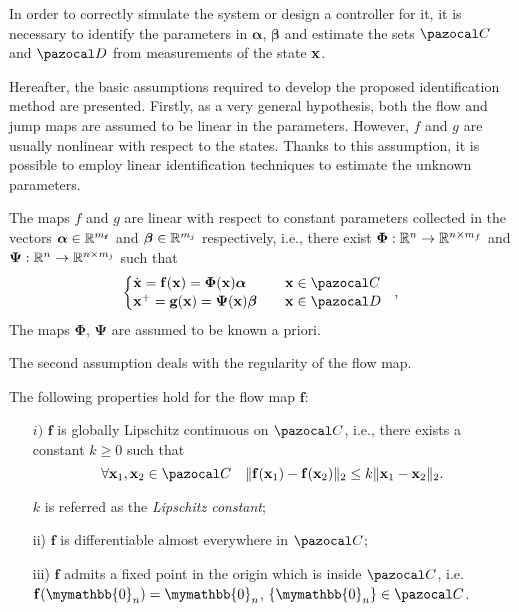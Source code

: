 In order to correctly simulate the system or design a controller for it, it is necessary to identify the parameters in $\bm{\alpha}$, $\bm{\beta}$ and estimate the sets $\C$ and $\D$ from measurements of the state $\mathbf{x}$.

Hereafter, the basic assumptions required to develop the proposed identification method are presented.
Firstly, as a very general hypothesis, both the flow and jump maps are assumed to be linear in the parameters. However, $f$ and $g$ are usually nonlinear with respect to the states.
Thanks to this assumption, it is possible to employ linear identification techniques to estimate the unknown parameters. 
\begin{assum}\label{ass:1}
	The maps $f$ and $g$ are linear {with respect to constant} parameters collected in the vectors $\bm{\alpha}\in\mathbb{R}^{m_\mathbf{f}}$ and $\bm{\beta}\in\mathbb{R}^{m_j}$ respectively, i.e., there exist $\bm{\Phi}:\mathbb{R}^{n}\rightarrow\mathbb{R}^{n\times m_f}$ and $\bm{\Psi}:\mathbb{R}^{n}\rightarrow\mathbb{R}^{n\times m_j}$ such that
	\begin{equation}
	\left\{ 
	\begin{matrix*}[l]\vspace{1pt}
	\dot{\x} = \mathbf{\mathbf{f}}(\x)= \bm{\Phi}(\x)\bm{\alpha}&&\x\in\C\\
	\x^+ = \mathbf{g}(\x)=\bm{\Psi}(\x)\bm{\beta}&&\x\in\D
	\end{matrix*}
	\right.~~,
	\end{equation}
	{%
	The maps $\bm{\Phi}$, $\bm{\Psi}$ are assumed to be known a priori.
	} 
\end{assum}
%
The second assumption deals with the regularity of the flow map. %
\begin{assum}\label{ass:2}
The following properties hold for the flow map $\mathbf{\mathbf{f}}$:
\begin{itemize}
	\item[$i)$]  $\mathbf{\mathbf{f}}$ is globally Lipschitz continuous on $\C$, i.e., there exists a constant $k\geq 0$ such that
	\begin{equation}
		\forall\x_1,\x_2\in\C\quad\|\mathbf{\mathbf{f}}(\x_1)-\mathbf{\mathbf{f}}(\x_2)\|_2\leq k \|\x_1-\x_2\|_2. 
	\end{equation}
	
	$k$ is referred as the \textit{Lipschitz constant};
	\item[ii)] $\mathbf{\mathbf{f}}$ is differentiable almost everywhere in $\C$;
	\item[iii)] $\mathbf{\mathbf{f}}$ admits a fixed point in the origin which is inside $\C$, i.e. $\mathbf{\mathbf{f}}(\mymathbb{0}_n)=\mymathbb{0}_n$, $\{\mymathbb{0}_n\}\in\C$.
\end{itemize} 
\end{assum}

